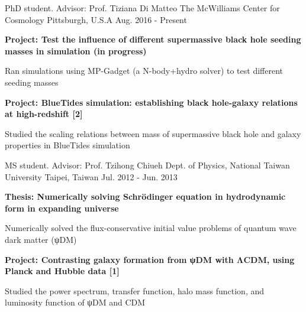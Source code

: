 


\begin{cventries}



\cventry
{PhD student. Advisor: Prof. Tiziana Di Matteo} %
{The McWilliams Center for Cosmology} %
{Pittsburgh, U.S.A} %
{Aug. 2016 - Present} %
{ %
\begin{cvitems}
\item \textbf{Project: Test the influence of different supermassive black hole seeding masses in simulation (in progress)}
\item {Ran simulations using MP-Gadget (a N-body+hydro solver) to test different seeding masses}
\item \textbf{Project: BlueTides simulation: establishing black hole-galaxy relations at high-redshift [2]}
\item {Studied the scaling relations between mass of supermassive black hole and galaxy properties in BlueTides simulation}
\end{cvitems}
}


\vspace{-6mm}

\cventry
{MS student. Advisor: Prof. Tzihong Chiueh} %
{Dept. of Physics, National Taiwan University} %
{Taipei, Taiwan} %
{Jul. 2012 - Jun. 2013} %
{ %
\begin{cvitems}
\item \textbf{Thesis: Numerically solving Schrödinger equation in hydrodynamic form in expanding universe}
\item {Numerically solved the flux-conservative initial value problems of quantum wave dark matter (ψDM)}
\item \textbf{Project: Contrasting galaxy formation from ψDM with ΛCDM, using Planck and Hubble data [1]}
\item {Studied the power spectrum, transfer function, halo mass function, and luminosity function of ψDM and CDM}
\end{cvitems}
}


\end{cventries}
